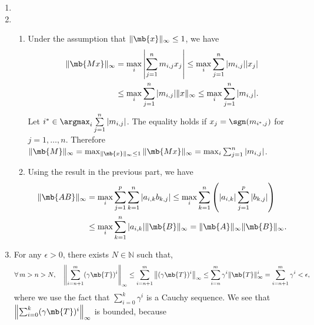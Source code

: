 \begin{exercise}
\begin{enumerate}
            \begin{solution}
                \begin{enumerate}
                    \item []
                    \item
                        \begin{enumerate}
                            \item Under the assumption that $\|\mb{x}\|_{\infty}\leq 1$, we have
                                \begin{align*}
                                    \|\mb{Mx}\|_\infty & = \max_i\left|\sum_{j=1}^n m_{i,j}x_j\right| \leq \max_i \sum_{j=1}^n |m_{i,j}||x_j| \\
                                                       & \leq \max_i \sum_{j=1}^n |m_{i,j}|\|x\|_\infty \le \max_i\sum_{j=1}^n|m_{i,j}|.
                                \end{align*}
                                Let $i^*\in\argmax_i\sum\limits_{j=1}^n|m_{i,j}|$. The equality holds if $x_j = \sgn (m_{i^*,j})$ for $j=1,\dots,n$. Therefore $\|\mb{M}\|_\infty = \max_{\|\mb{x}\|_{\infty}\leq 1}\|\mb{Mx}\|_\infty = \max_i\sum_{j=1}^n|m_{i,j}|$.
                            \item Using the result in the previous part, we have
                                \begin{align*}
                                    \|\mb{AB}\|_\infty & = \max_i \sum_{j=1}^p \sum_{k=1}^n |a_{i,k} b_{k,j}| \le \max_i  \sum_{k=1}^n \left(|a_{i,k}| \sum_{j=1}^p |b_{k,j}| \right) \\
                                                       & \le \max_i \sum_{k=1}^n |a_{i,k}| \|\mb{B}\|_\infty = \|\mb{A}\|_\infty \|\mb{B}\|_\infty.
                                \end{align*}
                        \end{enumerate}
                    \item For any $\epsilon > 0$, there exists $N \in \mathbb{N}$ such that,
                        \begin{align*}
                            \forall\, m>n>N,\quad \left\|\sum_{i=n+1}^m (\gamma \mb{T})^i\right\|_\infty \le \sum_{i=n+1}^m \left\|(\gamma \mb{T})^i\right\|_\infty \le \sum_{i=n}^m \gamma^i\|\mb{T}\|_\infty^i = \sum_{i=n+1}^m \gamma^i < \epsilon,
                        \end{align*}
                        where we use the fact that $\sum_{i=0}^k \gamma^i$ is a Cauchy sequence. We see that $\left\|\sum_{i=0}^k (\gamma \mb{T})^i\right\|_\infty$ is bounded, because

\end{enumerate}
\end{solution}
\end{enumerate}
\end{exercise}
